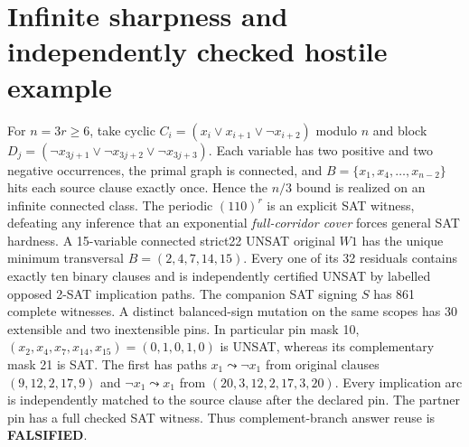\documentclass[10pt]{article}
\begin{document}
\section{Infinite sharpness and independently checked hostile example}
For $n=3r\ge6$, take cyclic $C_i=(x_i\vee x_{i+1}\vee\neg x_{i+2})$ modulo $n$ and block $D_j=(\neg x_{3j+1}\vee\neg x_{3j+2}\vee\neg x_{3j+3})$. Each variable has two positive and two negative occurrences, the primal graph is connected, and $B=\{x_1,x_4,\ldots,x_{n-2}\}$ hits each source clause exactly once. Hence the $n/3$ bound is realized on an infinite connected class. The periodic $(110)^r$ is an explicit SAT witness, defeating any inference that an exponential \emph{full-corridor cover} forces general SAT hardness.
A 15-variable connected strict22 UNSAT original $W1$ has the unique minimum transversal $B=(2,4,7,14,15)$. Every one of its 32 residuals contains exactly ten binary clauses and is independently certified UNSAT by labelled opposed 2-SAT implication paths. The companion SAT signing $S$ has 861 complete witnesses. A distinct balanced-sign mutation on the same scopes has 30 extensible and two inextensible pins. In particular pin mask 10, $(x_2,x_4,x_7,x_{14},x_{15})=(0,1,0,1,0)$ is UNSAT, whereas its complementary mask 21 is SAT. The first has paths $x_1\leadsto\neg x_1$ from original clauses $(9,12,2,17,9)$ and $\neg x_1\leadsto x_1$ from $(20,3,12,2,17,3,20)$. Every implication arc is independently matched to the source clause after the declared pin. The partner pin has a full checked SAT witness. Thus complement-branch answer reuse is \textbf{FALSIFIED}.
\end{document}
